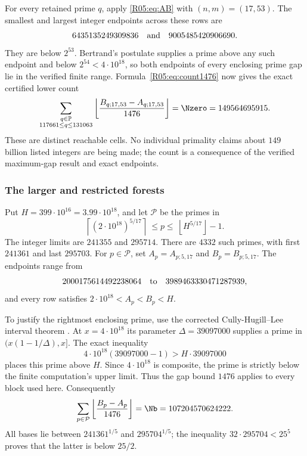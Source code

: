 \documentclass[11pt,a4paper]{article}
\theoremstyle{definition}\newtheorem{definition}[theorem]{Definition}
\theoremstyle{remark}\newtheorem{remark}[theorem]{Remark}
\newcommand{\PP}{\mathbb P}\newcommand{\W}{\mathcal W}\newcommand{\SaitoL}{\mathcal S}
\newcommand{\floor}[1]{\left\lfloor#1\right\rfloor}
\newcommand{\ceil}[1]{\left\lceil#1\right\rceil}
\begin{document}
For every retained prime $q$, apply \eqref{R05:eq:AB} with $(n,m)=(17,53)$.
The smallest and largest integer endpoints across these rows are
\[
 6435135249309836\quad\hbox{and}\quad9005485420906690.
\]
They are below $2^{53}$. Bertrand's postulate supplies a prime above
any such endpoint and below $2^{54}<4\cdot10^{18}$, so both endpoints
of every enclosing prime gap lie in the verified finite range.
Formula~\eqref{R05:eq:count1476} now gives the exact certified lower count
\begin{equation}\label{R05:eq:N0}
 \sum_{\substack{q\in\PP\\117661\le q\le131063}}
 \floor{\frac{B_{q;17,53}-A_{q;17,53}}{1476}}
 =\Nzero=149564695915.
\end{equation}
These are distinct reachable cells. No individual primality claims
about $149$ billion listed integers are being made; the count is a
consequence of the verified maximum-gap result and exact endpoints.

\subsubsection{The larger and restricted forests}

Put $H=399\cdot10^{16}=3.99\cdot10^{18}$, and let $\mathcal P$ be
the primes in
\begin{equation}\label{R05:eq:first-range}
 \ceil{(2\cdot10^{18})^{5/17}}
 \ \le p\le\ \floor{H^{5/17}}-1.
\end{equation}
The integer limits are $241355$ and $295714$.
There are $4332$ such primes, with first $241361$ and last $295703$.
For $p\in\mathcal P$, set $A_p=A_{p;5,17}$ and $B_p=B_{p;5,17}$.
The endpoints range from
\[
 2000175614492238064\quad\hbox{to}\quad3989463330471287939,
\]
and every row satisfies $2\cdot10^{18}<A_p<B_p<H$.

To justify the rightmost enclosing prime, use the corrected
Cully-Hugill--Lee interval theorem \cite[Theorem~1 and Table~2]{R05-CHL}.
At $x=4\cdot10^{18}$ its parameter $\Delta=39097000$ supplies a prime
in $(x(1-1/\Delta),x]$. The exact inequality
\begin{equation}\label{R05:eq:right-end}
 4\cdot10^{18}(39097000-1)>H\cdot39097000
\end{equation}
places this prime above $H$. Since $4\cdot10^{18}$ is composite,
the prime is strictly below the finite computation's upper limit.
Thus the gap bound $1476$ applies to every block used here.
Consequently
\begin{equation}\label{R05:eq:Nb}
 \sum_{p\in\mathcal P}\floor{\frac{B_p-A_p}{1476}}
 =\Nb=107204570624222.
\end{equation}
All bases lie between $241361^{1/5}$ and $295704^{1/5}$; the inequality
$32\cdot295704<25^5$ proves that the latter is below $25/2$.
\end{document}
